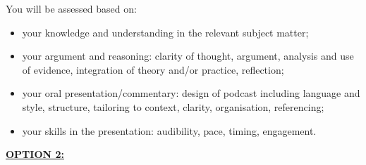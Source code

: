 \documentclass{article}
\begin{document}
\begin{itemize}
	You will be assessed based on:
	
	\begin{itemize}
		\item your knowledge and understanding in the relevant subject matter;
		\item your argument and reasoning: 	clarity of thought, argument, analysis and use of evidence, integration of theory and/or practice, reflection;
		\item your oral presentation/commentary: design of podcast including language and style, structure, tailoring to context, clarity, organisation, referencing;
		\item your skills in the presentation: audibility, pace, timing, engagement.
	\end{itemize}
\end{itemize}





\noindent\underline{\textbf{OPTION 2:}}
\end{document}
